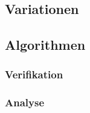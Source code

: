 \subsection{Variationen}

\subsection{Algorithmen}

\subsubsection{Verifikation}

\subsubsection{Analyse}

